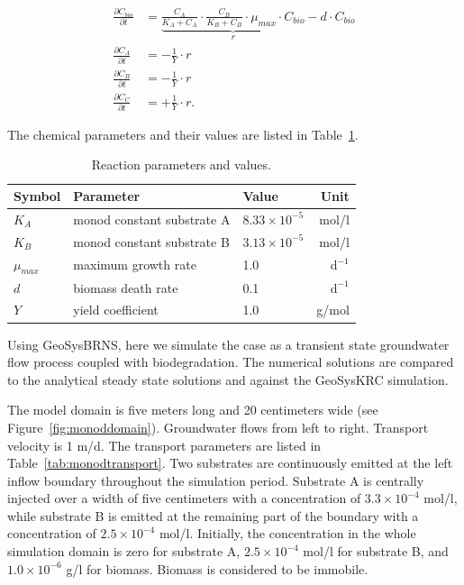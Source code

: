 \begin{align}
\frac{\partial C_{bio}}{\partial t} & = \underset{r}{\underbrace{\frac{C_A}{K_A+C_A}\cdot\frac{C_B}{K_B+C_B}\cdot\mu_{max}\cdot C_{bio}}} -d\cdot C_{bio} \\
\frac{\partial C_{A}}{\partial t} & = -\frac{1}{Y} \cdot r \\
\frac{\partial C_{B}}{\partial t} & = -\frac{1}{Y} \cdot r \\
\frac{\partial C_{C}}{\partial t} & = +\frac{1}{Y} \cdot r.
\end{align}

The chemical parameters and their values are listed in
Table~\ref{tab:monodparams}.

\begin{table}[!th]
\caption{Reaction parameters and values.} %
\label{tab:monodparams} \centering
\begin{tabular}{lllr}
\hline
\bf{Symbol} & \bf{Parameter} & \bf{Value} & \bf{Unit}\\
\hline
$K_A$ & monod constant substrate A & $8.33\times 10^{-5}$ & mol/l\\
$K_B$ & monod constant substrate B & $3.13\times 10^{-5}$ & mol/l\\
$\mu_{max}$ & maximum growth rate & 1.0 & $\mathrm{d^{-1}}$\\
$d$ & biomass death rate & 0.1 & $\mathrm{d^{-1}}$\\
$Y$ & yield coefficient & 1.0 & g/mol\\
\hline
\end{tabular}
\end{table}

Using GeoSysBRNS, here we simulate the case as a transient state
groundwater flow process coupled with biodegradation. The numerical solutions
are compared to the analytical steady state solutions and against the GeoSysKRC simulation.


The model domain is five meters long and 20 centimeters wide (see
Figure~\ref{fig:monoddomain}). Groundwater flows from left to right. Transport
velocity is 1 m/d. The transport parameters are listed in
Table~\ref{tab:monodtransport}. Two substrates are continuously emitted at the
left inflow boundary throughout the simulation period. Substrate A is centrally
injected over a width of five centimeters with a concentration of
$3.3\times10^{-4}$ mol/l, while substrate B is emitted at the remaining part of
the boundary with a concentration of $2.5\times10^{-4}$ mol/l. Initially, the
concentration in the whole simulation domain is zero for substrate A,
$2.5\times10^{-4}$ mol/l for substrate B, and $1.0\times10^{-6}$ g/l for
biomass. Biomass is considered to be immobile.

